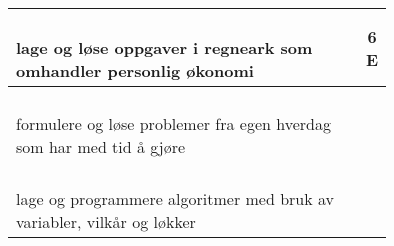 \begin{center}
\begin{tabular}{p{10.5cm} | c | c |}
\shortstack[l]{\\lage og løse oppgaver i regneark som \\omhandler personlig økonomi
} &\shortstack{} &\shortstack{6\\E} \\ \hline

\shortstack[l]{\\formulere og løse problemer fra egen hverdag\\ som har med tid å gjøre
} &\shortstack{} &\shortstack{} \\ \hline

\shortstack[l]{\\lage og programmere algoritmer med bruk av \\variabler, vilkår og løkker
} &\shortstack{} &\shortstack{} \\ \hline
\end{tabular}
\end{center}

